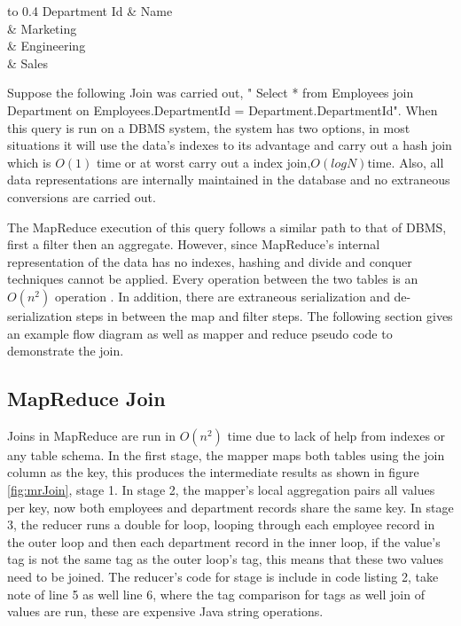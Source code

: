 \documentclass[10pt,twocolumn]{IEEEtran11}
\begin{document}
\begin{table}[h!]
	\centering
	\begin{tabu} to 0.4\textwidth { | X[l] | X[c] |}
		\hline
		 Department Id & Name\\ 
		  & Marketing   \\
		  & Engineering    \\
		& Sales  \\
		\hline
	\end{tabu}
	\caption{Hadoop vs DBMS-x performance}
	\label{table:hadoopVsDBMS}
\end{table}

Suppose the following Join was carried out, " Select * from Employees join Department on Employees.DepartmentId = Department.DepartmentId".
When this query is run on a DBMS system, the system has two options, in most situations it will use the data's indexes to its advantage and carry out a hash join which is $O(1)$ time or at worst carry out a index join,$ O(log N) $time.  Also, all data representations are internally maintained in the database and no extraneous conversions are carried out.
\par
The MapReduce execution of this query follows a similar path to that of DBMS, first a filter then an aggregate.  However, since MapReduce's internal representation of the data has no indexes, hashing and divide and conquer techniques cannot be applied.  Every operation between the two tables is an $O(n^2)$ operation \cite{afrati2010optimizing}.  In addition, there are extraneous serialization and de-serialization steps in between the map and filter steps.  The following section gives an example flow diagram as well as mapper and reduce pseudo code to demonstrate the join.

\subsection{MapReduce Join}

Joins in MapReduce are run in $O(n^2)$ time due to lack of help from indexes or any table schema.  In the first stage, the mapper maps both tables using the join column as the key, this produces the intermediate results as shown in figure \ref{fig:mrJoin}, stage 1.  In stage 2, the mapper's local aggregation pairs all values per key, now both employees and department records share the same key. In stage 3, the reducer  runs a double for loop, looping through each employee record in the outer loop and then each department record in the inner loop, if the value's tag is not the same tag as the outer loop's tag, this means that these two values need to be joined.  The reducer's code for stage is include in code listing 2, take note of line 5 as well line 6, where the tag comparison for tags as well join of values are run, these are expensive Java string operations. 
\end{document}
